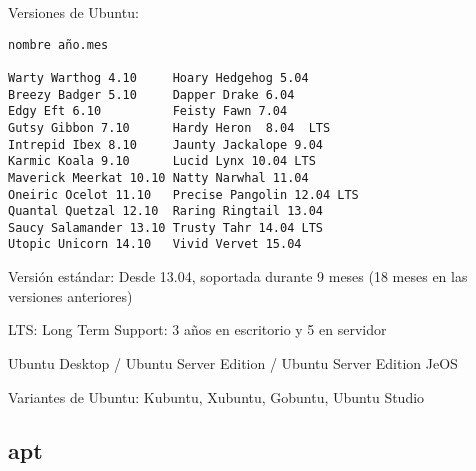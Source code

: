 \documentclass[ucs]{beamer}
\begin{document}
\begin{frame}[fragile]

Versiones de Ubuntu:


\begin{verbatim}	
nombre año.mes 

Warty Warthog 4.10     Hoary Hedgehog 5.04
Breezy Badger 5.10     Dapper Drake 6.04 
Edgy Eft 6.10          Feisty Fawn 7.04
Gutsy Gibbon 7.10      Hardy Heron  8.04  LTS
Intrepid Ibex 8.10     Jaunty Jackalope 9.04
Karmic Koala 9.10      Lucid Lynx 10.04 LTS
Maverick Meerkat 10.10 Natty Narwhal 11.04
Oneiric Ocelot 11.10   Precise Pangolin 12.04 LTS
Quantal Quetzal 12.10  Raring Ringtail 13.04
Saucy Salamander 13.10 Trusty Tahr 14.04 LTS
Utopic Unicorn 14.10   Vivid Vervet 15.04
\end{verbatim}

Versión estándar: Desde 13.04, soportada durante 9 meses
(18 meses en las versiones anteriores)

LTS: Long Term Support: 3 años en escritorio y 5 en servidor

\end{frame}
\begin{frame}[fragile]
Ubuntu Desktop / Ubuntu Server Edition / Ubuntu Server Edition JeOS

Variantes de Ubuntu: Kubuntu, Xubuntu, Gobuntu, Ubuntu Studio 



\end{frame}


\subsection{apt}
\end{document}
